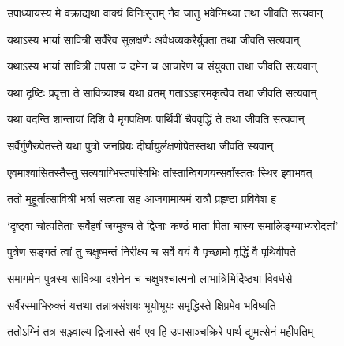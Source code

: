 \twolineshloka
{उपाध्यायस्य मे वक्राद्यथा वाक्यं विनिःसृतम्}
{नैव जातु भवेन्मिथ्या तथा जीवति सत्यवान्}




\twolineshloka
{यथाऽस्य भार्या सावित्री सर्वैरेव सुलक्षणैः}
{अवैधव्यकरैर्युक्ता तथा जीवति सत्यवान्}




\twolineshloka
{यथाऽस्य भार्या सावित्री तपसा च दमेन च}
{आचारेण च संयुक्ता तथा जीवति सत्यवान्}




\twolineshloka
{यथा दृष्टिः प्रवृत्ता ते सावित्र्याश्च यथा व्रतम्}
{गताऽऽहारमकृत्वैव तथा जीवति सत्यवान्}




\twolineshloka
{यथा वदन्ति शान्तायां दिशि वै मृगपक्षिणः}
{पार्थिवीं चैववृद्धिं ते तथा जीवति सत्यवान्}




\twolineshloka
{सर्वैर्गुणैरुपेतस्ते यथा पुत्रो जनप्रियः}
{दीर्घायुर्लक्षणोपेतस्तथा जीवति स्यवान्}




\twolineshloka
{एवमाश्वासितस्तैस्तु सत्यवाग्भिस्तपस्विभिः}
{तांस्तान्विगणयन्सर्वांस्ततः स्थिर इवाभवत्}


\twolineshloka
{ततो मुहूर्तात्सावित्री भर्त्रा सत्वता सह}
{आजगामाश्रमं रात्रौ प्रहृष्टा प्रविवेश ह}


\twolineshloka
{`दृष्ट्वा चोत्पतिताः सर्वेहर्षं जग्मुश्च ते द्विजाः}
{कण्ठं माता पिता चास्य समालिङ्ग्याभ्यरोदतां'}




\twolineshloka
{पुत्रेण सङ्गतं त्वां तु चक्षुष्मन्तं निरीक्ष्य च}
{सर्वे वयं वै पृच्छामो वृद्धिं वै पृथिवीपते}


\twolineshloka
{समागमेन पुत्रस्य सावित्र्या दर्शनेन च}
{चक्षुषश्चात्मनो लाभात्रिभिर्दिष्ठ्या विवर्धसे}


\twolineshloka
{सर्वैरस्माभिरुक्तं यत्तथा तन्नात्रसंशयः}
{भूयोभूयः समृद्धिस्ते क्षिप्रमेव भविष्यति}




\twolineshloka
{ततोऽग्निं तत्र सञ्ज्वाल्य द्विजास्ते सर्व एव हि}
{उपासाञ्चक्रिरे पार्थ द्युमत्सेनं महीपतिम्}


